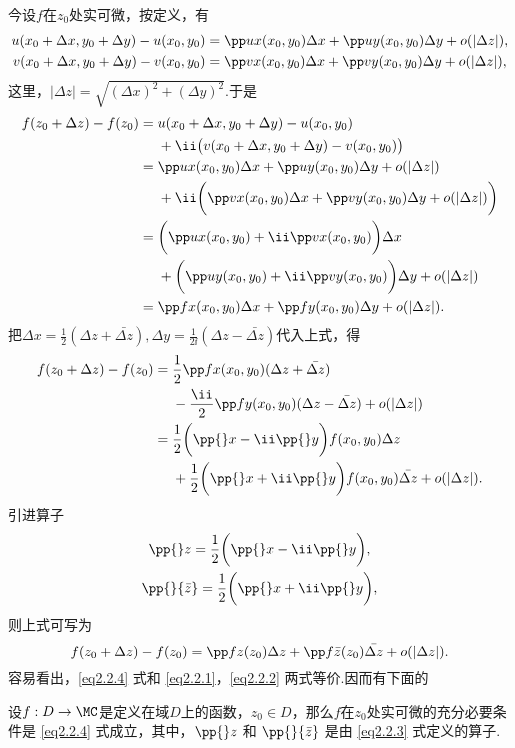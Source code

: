 今设$f$在$z_0$处实可微，按定义，有
\begin{gather}
  u(x_0 + \Delta x,y_0 + \Delta y) - u(x_0,y_0) = \pp ux(x_0,y_0)\Delta x + \pp uy(x_0,y_0)\Delta y + o(|\Delta z|),\label{eq2.2.1}\\
  v(x_0 + \Delta x,y_0 + \Delta y) - v(x_0,y_0) = \pp vx(x_0,y_0)\Delta x + \pp vy(x_0,y_0)\Delta y + o(|\Delta z|)\label{eq2.2.2},
\end{gather}
这里，$|\Delta z|=\sqrt{(\Delta x)^2+(\Delta y)^2}$.于是
\begin{align*}
  f(z_0 + \Delta z) - f(z_0) = {}& u(x_0 + \Delta x,y_0 + \Delta y) - u(x_0,y_0)\\
  & +  \ii\big(v(x_0 + \Delta x,y_0 + \Delta y)-v(x_0,y_0)\big)\\
  = {}& \pp ux(x_0,y_0) \Delta x + \pp uy(x_0,y_0) \Delta y + o(|\Delta z|)\\
  & + \ii\bigg(\pp vx(x_0,y_0)\Delta x + \pp vy(x_0,y_0)\Delta y + o(|\Delta z|)\bigg)\\
  = {}& \bigg(\pp ux(x_0,y_0) + \ii\pp vx(x_0,y_0)\bigg)\Delta x\\
  & + \bigg(\pp uy(x_0,y_0) + \ii\pp vy(x_0,y_0)\bigg)\Delta y + o(|\Delta z|)\\
  = {}& \pp fx(x_0,y_0)\Delta x + \pp fy(x_0,y_0)\Delta y + o(|\Delta z|).
\end{align*}
把$\Delta x=\frac12(\Delta z+\bar{\Delta z}),\Delta y=\frac1{2\ii}(\Delta z-\bar{\Delta z})$代入上式，得
\begin{align*}
  f(z_0 + \Delta z) - f(z_0) = {}& \frac12\pp fx(x_0,y_0)(\Delta z + \bar{\Delta z})\\
  & - \frac{\ii}2\pp fy(x_0,y_0)(\Delta z - \bar{\Delta z}) + o(|\Delta z|)\\
  = {}& \frac12\bigg(\pp {}x - \ii\pp{}y\bigg)f(x_0,y_0)\Delta z\\
  & + \frac12\bigg(\pp{}x + \ii\pp{}y\bigg)f(x_0,y_0)\bar{\Delta z} + o(|\Delta z|).
\end{align*}
引进算子
\begin{equation}\label{eq2.2.3}
  \begin{gathered}
    \pp{}z = \frac12\bigg( \pp{}x - \ii\pp{}y \bigg),\\
    \pp{}{\bar z} = \frac12\bigg( \pp{}x+\ii\pp{}y \bigg),
  \end{gathered}
\end{equation}
则上式可写为
\begin{equation}\label{eq2.2.4}
  f(z_0 + \Delta z) - f(z_0) = \pp fz(z_0)\Delta z + \pp f{\bar z}(z_0)\bar{\Delta z} + o(|\Delta z|).
\end{equation}
容易看出，\eqref{eq2.2.4} 式和 \eqref{eq2.2.1}，\eqref{eq2.2.2} 两式等价.因而有下面的
\begin{prop}
  设$f:D\to\MC$是定义在域$D$上的函数，$z_0\in D$，那么$f$在$z_0$处实可微的充分必要条件是  \eqref{eq2.2.4} 式成立，其中，$\pp{}z$ 和 $\pp{}{\bar z}$ 是由 \eqref{eq2.2.3} 式定义的算子.
\end{prop}

